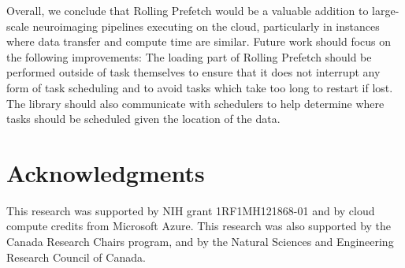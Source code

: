 
Overall, we conclude that Rolling Prefetch would be a valuable addition to large-scale neuroimaging pipelines executing
on the cloud, particularly in instances where data transfer and compute time are similar. 
Future work should focus on the following improvements: The loading part of Rolling Prefetch should be performed outside of task themselves to ensure that it does not interrupt any form of task scheduling and to avoid tasks which take too long to restart if lost. 
The library should also communicate with schedulers to help determine where tasks
should be scheduled given the location of the data.

\section{Acknowledgments} 

This research was supported by NIH grant 1RF1MH121868-01 and by cloud compute credits from Microsoft Azure. This research was also supported by the Canada Research Chairs program, and by the Natural Sciences and Engineering Research Council of Canada.


